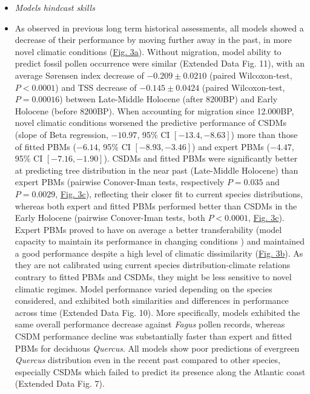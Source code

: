 \documentclass[pdflatex, sn-nature]{sn-jnl}%
\begin{document}
\renewcommand\labelitemi{{\boldmath$\cdot$}}
\begin{itemize}
\setlength\itemsep{1em}
\item \emph{Models hindcast skills}\par
\item As observed in previous long term historical assessments, all models showed a decrease of their performance by moving further away in the past, in more novel climatic conditions (\hyperref[past_performance]{Fig. 3a}). 
Without migration, model ability to predict fossil pollen occurrence were similar (Extended Data Fig. 11), with an average Sørensen index decrease of $-0.209\pm0.0210$ (paired Wilcoxon-test, $P<0.0001$) and TSS decrease of $-0.145\pm0.0424$ (paired Wilcoxon-test, $P=0.00016$) between Late-Middle Holocene (after 8200BP) and Early Holocene (before 8200BP).  When accounting for migration since 12.000BP, novel climatic conditions worsened the predictive performance of CSDMs (slope of Beta regression, $-10.97$, 95\% CI $[-13.4, -8.63]$) more than those of fitted PBMs ($-6.14$, 95\% CI $[-8.93, -3.46]$) and expert PBMs ($-4.47$, 95\% CI $[-7.16, -1.90]$). CSDMs and fitted PBMs were significantly better at predicting tree distribution in the near past (Late-Middle Holocene) than expert PBMs (pairwise Conover-Iman tests, respectively $P=0.035$ and $P=0.0029$, \hyperref[past_performance]{Fig. 3c}), reflecting their closer fit to current species distributions, whereas both expert and fitted PBMs performed better than CSDMs in the Early Holocene (pairwise Conover-Iman tests, both $P<0.0001$, \hyperref[past_performance]{Fig. 3c}). 
Expert PBMs proved to have on average a better transferability (model capacity to maintain its performance in changing conditions \cite{UribeRivera2022}) and maintained a good performance despite a high level of climatic dissimilarity (\hyperref[past_performance]{Fig. 3b}). 
As they are not calibrated using current species distribution-climate relations contrary to fitted PBMs and CSDMs, they might be less sensitive to novel climatic regimes. Model performance varied depending on the species considered, and exhibited both similarities and differences in performance across time (Extended Data Fig. 10). More specifically, models exhibited the same overall performance decrease against \emph{Fagus} pollen records, whereas CSDM performance decline was substantially faster than expert and fitted PBMs for deciduous \emph{Quercus}. All models show poor predictions of evergreen \emph{Quercus} distribution even in the recent past compared to other species, especially CSDMs which failed to predict its presence along the Atlantic coast (Extended Data Fig. 7).


\end{itemize}
\end{document}

